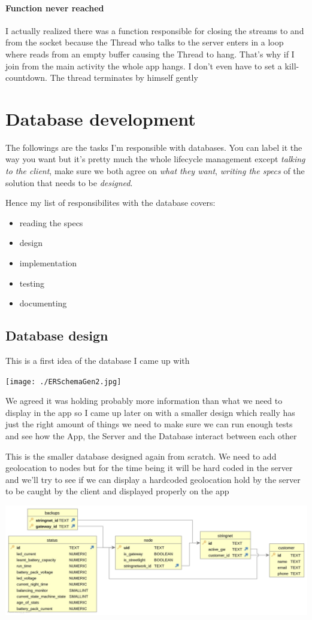 \documentclass[a4paper,12pt]{book}
\begin{document}
\subsection{Function never reached}
I actually realized there was a function responsible for closing the streams to and from the socket because the Thread who talks to the server enters in a loop where reads from an empty buffer causing the Thread to hang. That's why if I join from the main activity the whole app hangs. I don't even have to set a kill-countdown. The thread terminates by himself gently

\part{Database development}

The followings are the tasks I'm responsible with databases. You can label it the way you want but it's pretty much the whole lifecycle management except \emph{talking to the client}, make sure we both agree on \emph{what they want}, \emph{writing the specs} of the solution that needs to be \emph{designed}.

Hence my list of responsibilites with the database covers:

\begin{itemize}
\item {reading the specs}
\item design
\item implementation
\item testing 
\item documenting
\end{itemize}

\clearpage

\chapter{Database design}
This is a first idea of the database I came up with

\noindent\texttt{[image: ./ERSchemaGen2.jpg]}

We agreed it was holding probably more information than what we need to display in the app so I came up later on with a smaller design which really has just the right amount of things we need to make sure we can run enough tests and see how the App, the Server and the Database interact between each other
\clearpage

This is the smaller database designed again from scratch. We need to add geolocation to nodes but for the time being it will be hard coded in the server and we'll try to see if we can display a hardcoded geolocation hold by the server to be caught by the client and displayed properly on the app

\noindent\includegraphics[width=14cm]{./SecondERSchemaGen2.jpg}

\printindex
\end{document}
